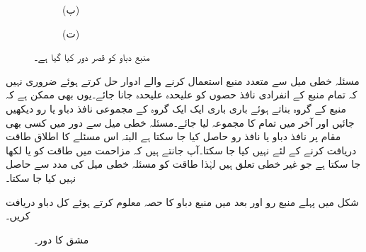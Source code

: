 \begin{figure}
\begin{subfigure}{0.5\textwidth}
\caption*{(پ)}
\end{subfigure}%
\begin{subfigure}{0.5\textwidth}
\centering
{}
\caption*{(ت)}
\end{subfigure}%
\caption{منبع دباو کو قصر دور کیا گیا ہے۔}
\label{شکل_مسئلہ_منبع_دباو_قصر_دور_کیا_گیا_ہے}
\end{figure}

مسئلہ خطی میل سے متعدد منبع استعمال کرنے والے ادوار حل کرتے ہوئے ضروری نہیں کہ تمام منبع کے انفرادی نافذ حصوں کو علیحدہ علیحدہ جانا جائے۔یوں بھی ممکن ہے کہ منبع کے گروہ بناتے ہوئے باری باری ایک ایک گروہ کے مجموعی نافذ دباو یا رو دیکھیں جائیں اور آخر میں تمام کا مجموعہ لیا جائے۔مسئلہ خطی میل سے دور میں کسی بھی مقام پر نافذ  دباو یا نافذ رو حاصل کیا جا سکتا ہے البتہ اس مسئلے کا اطلاق طاقت دریافت کرنے کے لئے نہیں کیا جا سکتا۔آپ جانتے ہیں کہ مزاحمت میں طاقت کو  یا  لکھا جا سکتا ہے جو غیر خطی تعلق ہیں لہٰذا طاقت کو مسئلہ خطی میل کی مدد سے حاصل نہیں کیا جا سکتا۔

شکل  میں پہلے منبع رو اور بعد میں منبع دباو کا حصہ معلوم کرتے ہوئے کل دباو  دریافت کریں۔

\begin{figure}
\centering
{}
\caption{مشق  کا دور۔}
\label{شکل_مسئلہ_باری_باری_الف}
\end{figure}

